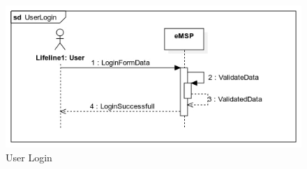 \documentclass{Configuration_Files/PoliMi3i_thesis}
\begin{document}
\begin{figure}[H]
    \centering
    \includegraphics[width=1\textwidth]{Images/UseCases/UserLogin.jpg}
    \caption{User Login}
\end{figure}

\end{document}
